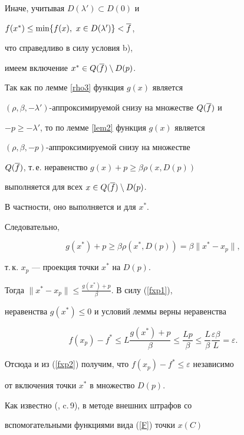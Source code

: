 Иначе, учитывая $D(\lambda')\subset D(0)$ и 


$f(x^*)\leq\min\{f(x),\ x\in D(\lambda')\}<\overline f$,


что справедливо в силу условия b),


имеем включение $x^*\in Q(\overline f)\setminus D(p)$.





Так как по лемме \ref{rho3} функция $g(x)$ является 


$(\rho,\beta,-\lambda')$-аппроксимируемой снизу на множестве $Q(\overline f)$ и


$-p\geq -\lambda'$, то по лемме \ref{lem2} функция $g(x)$ является 


$(\rho,\beta,-p)$-аппроксимируемой снизу на множестве


$Q(\overline f)$, т.\,е. неравенство $g(x)+p\geq\beta\rho(x,D(p))$ 


выполняется для всех $x\in Q(\overline f)\setminus D(p)$. 


В частности, оно выполняется и для $x^*$.


Следовательно,


\begin{equation}\label{gg1}


g(x^*)+p\geq \beta\rho(x^*,D(p))=\beta\|x^*-x_p\|,


\end{equation}


т.\,к. $x_p$ --- проекция точки $x^*$ на $D(p)$.


Тогда $\|x^*-x_p\|\leq\frac{g(x^*)+p}{\beta}$. В силу (\ref{fxp1}), 


неравенства $g(x^*)\leq 0$ и условий леммы верны неравенства


\begin{equation}\label{tsep}


f(x_p)-f^*\leq L\frac{g(x^*)+p}{\beta} \leq\frac{Lp}{\beta}\leq


\frac{L}{\beta}\frac{\varepsilon\beta}{L}=\varepsilon.


\end{equation}


Отсюда и из (\ref{fxp2}) получим, что $f(x_p)-f^*\leq\varepsilon$ независимо 


от включения точки $x^*$ в множество $D(p)$.





Как известно (\cite{Fiacco}, c.\,9), в методе внешних штрафов со


вспомогательными функциями вида (\ref{F}) точки $x(C)$


